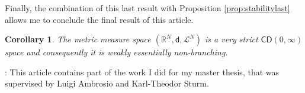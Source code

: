 \documentclass[11pt,twoside,a4paper]{article}
\newcommand{\Leb}{\mathscr{L}}
\newcommand{\R}{\mathbb{R}}
\newcommand{\CD}{\mathsf{CD}}
\newcommand{\di}{\mathsf d} %
\theoremstyle{theorem}
\newtheorem{corollary}[theorem]{Corollary}
\theoremstyle{definition}
\theoremstyle{remark}
\theoremstyle{proof}
\begin{document}
\noindent Finally, the combination of this last result with Proposition \ref{prop:stabilitylast} allows me to conclude the final result of this article.

\begin{corollary}
The metric measure space $(\R^N,\di,\Leb^N)$ is a very strict $\CD(0,\infty)$ space and consequently it is weakly essentially non-branching.
\end{corollary} 

 : This article contains part of the work I did for my master thesis, that was supervised by Luigi Ambrosio and Karl-Theodor Sturm.




 
\end{document}
